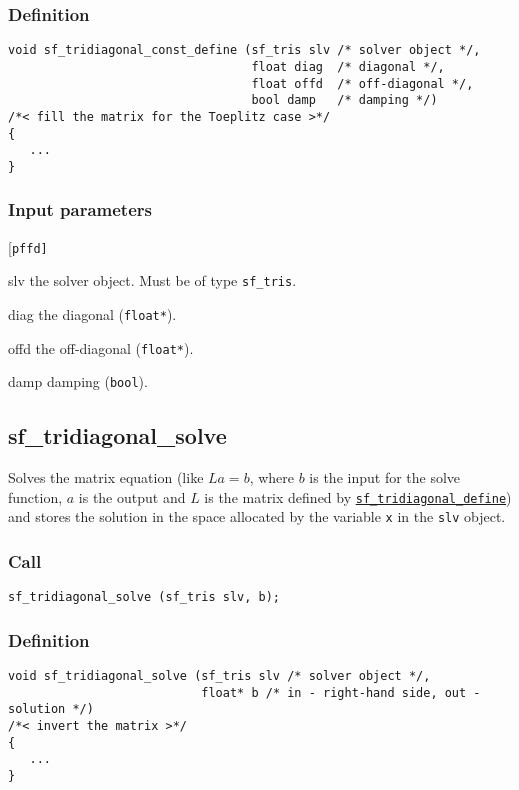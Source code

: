 \subsubsection*{Definition}
\begin{verbatim}
void sf_tridiagonal_const_define (sf_tris slv /* solver object */, 
                                  float diag  /* diagonal */, 
                                  float offd  /* off-diagonal */,
                                  bool damp   /* damping */)
/*< fill the matrix for the Toeplitz case >*/
{
   ...
}
\end{verbatim}

\subsubsection*{Input parameters}
\begin{desclist}{\tt }{\quad}[\tt pffd]
   \setlength\itemsep{0pt}
   \item[slv]  the solver object. Must be of type \texttt{sf\_tris}. 
   \item[diag] the diagonal (\texttt{float*}).
   \item[offd] the off-diagonal (\texttt{float*}).
   \item[damp] damping (\texttt{bool}).
\end{desclist}




\subsection{{sf\_tridiagonal\_solve}}\label{sec:sf_tridiagonal_solve}
Solves the matrix equation (like $La=b$, where $b$ is the input for the solve function, $a$ is the output and $L$ is the matrix defined by \hyperref[sec:sf_tridiagonal_define]{\texttt{sf\_tridiagonal\_define}}) and stores the solution in the space allocated by the variable \texttt{x} in the \texttt{slv} object.


\subsubsection*{Call}
\begin{verbatim}sf_tridiagonal_solve (sf_tris slv, b);\end{verbatim}

\subsubsection*{Definition}
\begin{verbatim}
void sf_tridiagonal_solve (sf_tris slv /* solver object */, 
                           float* b /* in - right-hand side, out - solution */)
/*< invert the matrix >*/
{
   ...
}
\end{verbatim}

